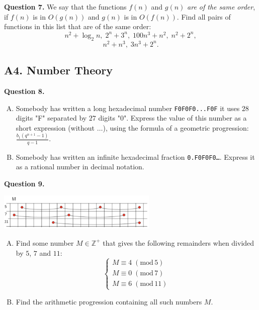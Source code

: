 \documentclass[jou]{apa6}
\begin{document}
\vspace{6pt}
{\bf Question 7.} We say that the functions $f(n)$ and $g(n)$
{\em are of the same order}, if $f(n)$ is in $O(g(n))$ and
$g(n)$ is in $O(f(n))$. Find all pairs of functions in this 
list that are of the same order:
$$n^2 + \log_2 n,\; 2^n + 3^n,\; 100n^3 + n^2,\; n^2 + 2^n,$$
$$n^2 + n^3,\;3n^3 + 2^n.$$






\subsection{A4. Number Theory}


{\bf Question 8.}
\begin{enumerate}[(A)]
\item
Somebody has written a long hexadecimal number
{\tt F0F0F0...F0F} \textendash{} it uses $28$ digits "F"
separated by $27$ digits "0". 
Express the value of this number as a short expression
(without $\ldots$), using
the formula of a geometric progression: $\frac{b_1(q^{n+1}-1)}{q - 1}$. 
\item 
Somebody has written an infinite hexadecimal fraction 
{\tt 0.F0F0F0\ldots}. Express it as a rational number in 
decimal notation. 
\end{enumerate}



\vspace{6pt}
{\bf Question 9.} 
\begin{center}
\includegraphics[width=3in]{midterm/sequences.png}
\end{center}

\begin{enumerate}[(A)]
\item Find some number $M \in \mathbb{Z}^{+}$ 
that gives the following remainders when divided by 
$5$, $7$ and $11$: 
$$\left\{
\begin{array}{l}
M \equiv 4\;(\text{mod}\,5)\\
M \equiv 0\;(\text{mod}\,7)\\
M \equiv 6\;(\text{mod}\,11)
\end{array} \right.$$
\item Find the arithmetic progression containing all such numbers $M$.
\end{enumerate}
\end{document}
